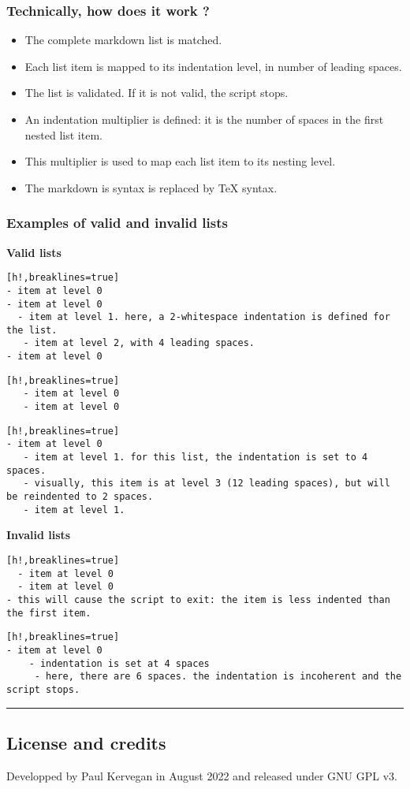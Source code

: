 \subsubsection{Technically, how does it work ?}

\begin{itemize}
\item The complete markdown list is matched.
\item Each list item is mapped to its indentation level, in number of leading spaces.
\item The list is validated. If it is not valid, the script stops.
\item An indentation multiplier is defined: it is the number of spaces in the first nested list item.
\item This multiplier is used to map each list item to its nesting level.
\item The markdown is syntax is replaced by TeX syntax. 
\end{itemize}
\subsubsection{Examples of valid and invalid lists}

\noindent{}\textbf{Valid lists}

\begin{Verbatim}[h!,breaklines=true]
- item at level 0
- item at level 0
  - item at level 1. here, a 2-whitespace indentation is defined for the list.
   - item at level 2, with 4 leading spaces.
- item at level 0
\end{Verbatim}

\begin{Verbatim}[h!,breaklines=true]
   - item at level 0
   - item at level 0
\end{Verbatim}

\begin{Verbatim}[h!,breaklines=true]
- item at level 0
   - item at level 1. for this list, the indentation is set to 4 spaces.
   - visually, this item is at level 3 (12 leading spaces), but will be reindented to 2 spaces.
   - item at level 1.
\end{Verbatim}

\noindent{}\textbf{Invalid lists}

\begin{Verbatim}[h!,breaklines=true]
  - item at level 0
  - item at level 0
- this will cause the script to exit: the item is less indented than the first item.
\end{Verbatim}

\begin{Verbatim}[h!,breaklines=true]
- item at level 0
	- indentation is set at 4 spaces
	 - here, there are 6 spaces. the indentation is incoherent and the script stops.
\end{Verbatim}

\par\noindent\rule{\linewidth}{0.4pt}
\subsection{License and credits}

Developped by Paul Kervegan in August 2022 and released under GNU GPL v3.
